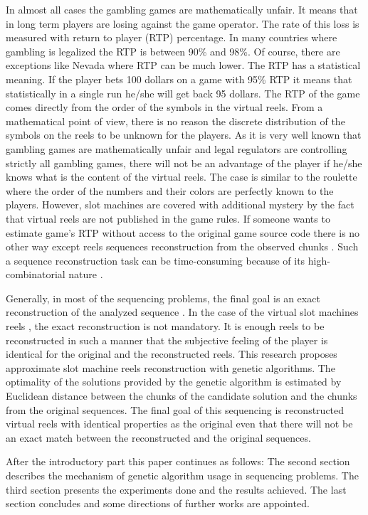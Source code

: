 \documentclass[11pt]{article}
\begin{document}
In almost all cases the gambling games are mathematically unfair. It means that in long term players are losing against the game operator. The rate of this loss is measured with return to player (RTP) percentage. In many countries where gambling is legalized the RTP is between 90\% and 98\%. Of course, there are exceptions like Nevada where RTP can be much lower. The RTP has a statistical meaning. If the player bets 100 dollars on a game with 95\% RTP it means that statistically in a single run he/she will get back 95 dollars. The RTP of the game comes directly from the order of the symbols in the virtual reels. From a mathematical point of view, there is no reason the discrete distribution of the symbols on the reels to be unknown for the players. As it is very well known that gambling games are mathematically unfair and legal regulators are controlling strictly all gambling games, there will not be an advantage of the player if he/she knows what is the content of the virtual reels. The case is similar to the roulette where the order of the numbers and their colors are perfectly known to the players. However, slot machines are covered with additional mystery by the fact that virtual reels are not published in the game rules. If someone wants to estimate game's RTP without access to the original game source code there is no other way except reels sequences reconstruction from the observed chunks \cite{Vaidyanathan-Phoong-1995}. Such a sequence reconstruction task can be time-consuming because of its high-combinatorial nature \cite{Lewis-1998}.

Generally, in most of the sequencing problems, the final goal is an exact reconstruction of the analyzed sequence \cite{Parsons-Johnson-1997}. In the case of the virtual slot machines reels \cite{Tomov-Zankinski-Balabanov-2017-1}, the exact reconstruction is not mandatory. It is enough reels to be reconstructed in such a manner that the subjective feeling of the player is identical for the original and the reconstructed reels. This research proposes approximate slot machine reels reconstruction with genetic algorithms. The optimality of the solutions provided by the genetic algorithm is estimated by Euclidean distance between the chunks of the candidate solution and the chunks from the original sequences. The final goal of this sequencing is reconstructed virtual reels with identical properties as the original even that there will not be an exact match between the reconstructed and the original sequences. 

After the introductory part this paper continues as follows: The second section describes the mechanism of genetic algorithm usage in sequencing problems. The third section presents the experiments done and the results achieved. The last section concludes and some directions of further works are appointed. 
\end{document}

